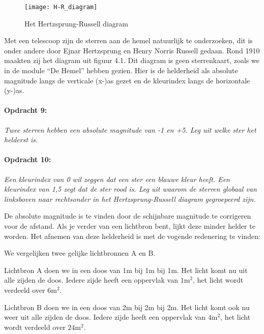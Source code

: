 \begin{figure}[h]
\noindent \begin{centering}
\texttt{[image: H-R\_diagram]}
\par\end{centering}

\caption{Het Hertzsprung-Russell diagram}
\end{figure}


Met een telescoop zijn de sterren aan de hemel natuurlijk te onderzoeken,
dit is onder andere door Ejnar Hertzsprung en Henry Norris Russell
gedaan. Rond 1910 maakten zij het diagram uit figuur 4.1. Dit diagram
is geen sterrenkaart, zoals we in de module ``De Hemel'' hebben
gezien. Hier is de helderheid als absolute magnitude langs de verticale
(x-)as gezet en de kleurindex langs de horizontale (y-)as.


\paragraph*{Opdracht 9:}

\emph{Twee sterren hebben een absolute magnitude van -1 en +5. Leg
uit welke ster het helderst is.}


\paragraph*{Opdracht 10:}

\emph{Een kleurindex van 0 wil zeggen dat een ster een blauwe kleur
heeft. Een kleurindex van 1,5 zegt dat de ster rood is. Leg uit waarom
de sterren globaal van linksboven naar rechtsonder in het Hertzsprung-Russell
diagram gegroepeerd zijn. }

De absolute magnitude is te vinden door de schijnbare magnitude te
corrigeren voor de afstand. Als je verder van een lichtbron bent,
lijkt deze minder helder te worden. Het afnemen van deze helderheid
is met de vogende redenering te vinden:

We vergelijken twee gelijke lichtbronnen A en B.

Lichtbron A doen we in een doos van 1m bij 1m bij 1m. Het licht komt
nu uit alle zijden de doos. Iedere zijde heeft een oppervlak van $1\mathrm{m}^{2}$,
het licht wordt verdeeld over $6\mathrm{m}^{2}$.

Lichtbron B doen we in een doos van 2m bij 2m bij 2m. Het licht komt
ook nu weer uit alle zijden de doos. Iedere zijde heeft een oppervlak
van $4\mathrm{m}^{2}$, het licht wordt verdeeld over $24\mathrm{m}^{2}$.

